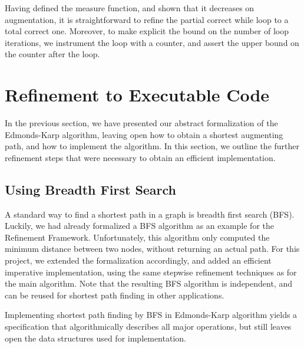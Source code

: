 \documentclass{llncs}
\begin{document}
  Having defined the measure function, and shown that it decreases on augmentation, it is straightforward to refine the partial correct while loop to a total correct one. Moreover, to make explicit the bound on the number of loop iterations, we instrument the loop with a counter, and assert the upper bound on the counter after the loop.


    
\section{Refinement to Executable Code}\label{sec:executable}
  In the previous section, we have presented our abstract formalization of the Edmonds-Karp algorithm,
  leaving open how to obtain a shortest augmenting path, and how to implement the algorithm. 
  In this section, we outline the further refinement steps that were necessary to obtain an efficient implementation.

  \subsection{Using Breadth First Search}
  A standard way to find a shortest path in a graph is breadth first search (BFS). Luckily, we had already formalized a BFS algorithm as an example for the Refinement Framework. Unfortunately, this algorithm only computed the minimum distance between two nodes, without returning an actual path. For this project, we extended the formalization accordingly, and added an efficient imperative implementation, using the same stepwise refinement techniques as for the main algorithm. Note that the resulting BFS algorithm is independent, and can be reused for shortest path finding in other applications. 
  
  Implementing shortest path finding by BFS in Edmonds-Karp algorithm yields a specification that algorithmically describes all major operations, but still leaves open the data structures used for implementation.
  
\end{document}
